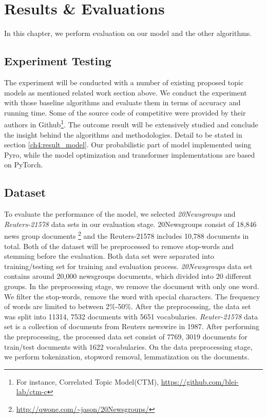 \section{Results \& Evaluations}
In this chapter, we perform evaluation on our model and the other algorithms. 
\subsection{Experiment Testing}
The experiment will be conducted with a number of existing proposed topic models as mentioned related work section above. We conduct the experiment with those baseline algorithms and evaluate them in terms of accuracy and running time. Some of the source code of competitive were provided by their authors in Github\footnote{For instance, Correlated Topic Model(CTM), \href{https://github.com/blei-lab/ctm-c}{https://github.com/blei-lab/ctm-c}}. The outcome result will be extensively studied and conclude the insight behind the algorithms and methodologies. Detail to be stated in section \ref{ch4:result_model}. Our probabilistic part of model implemented using Pyro\cite{bingham_pyro_2019}, while the model optimization and transformer implementations are based on PyTorch\cite{paszke_automatic_2017}.
\subsection{Dataset}To evaluate the performance of the model, we selected \textit{20Newsgroups} and \textit{Reuters-21578} data sets in our evaluation stage. 20Newsgroups consist of 18,846 news group documents \footnote{\url{http://qwone.com/~jason/20Newsgroups/}} and the Reuters-21578 includes 10,788 documents in total. Both of the dataset will be preprocessed to remove stop-words and stemming before the evaluation. Both data set were separated into training/testing set for training and evaluation process.
\textit{20Newsgroups} data set contains around 20,000 newsgroups documents, which divided into 20 different groups. In the preprocessing stage, we remove the document with only one word. We filter the stop-words, remove the word with special characters. The frequency of words are limited to between 2\%-50\%. After the preprocessing, the data set was split into 11314, 7532 documents with 5651 vocabularies. 
\textit{Reuter-21578} data set is a collection of documents from Reuters newswire in 1987. After performing the preprocessing, the processed data set consist of 7769, 3019 documents for train/test documents with 1622 vocabularies.
On the data preprocessing stage, we perform tokenization, stopword removal, lemmatization on the documents.
